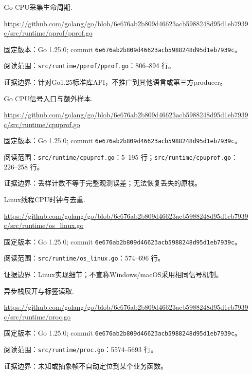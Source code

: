 \documentclass[UTF8,fontset=fandol,openany,11pt]{ctexbook}
\begin{document}
\begin{thebibliography}{999}
 Go CPU采集生命周期.\par
\url{https://github.com/golang/go/blob/6e676ab2b809d46623acb5988248d95d1eb7939c/src/runtime/pprof/pprof.go}\par
{\small\raggedright 固定版本：Go 1.25.0; commit \texttt{6e676ab2\allowbreak{}b809d466\allowbreak{}23acb598\allowbreak{}8248d95d\allowbreak{}1eb7939c}。\par
阅读范围：\nolinkurl{src/runtime/pprof/pprof.go}：806–894 行。\par
证据边界：针对Go1.25标准库API，不推广到其他语言或第三方producer。
}

 Go CPU信号入口与额外样本.\par
\url{https://github.com/golang/go/blob/6e676ab2b809d46623acb5988248d95d1eb7939c/src/runtime/cpuprof.go}\par
{\small\raggedright 固定版本：Go 1.25.0; commit \texttt{6e676ab2\allowbreak{}b809d466\allowbreak{}23acb598\allowbreak{}8248d95d\allowbreak{}1eb7939c}。\par
阅读范围：\nolinkurl{src/runtime/cpuprof.go}：5–195 行；\nolinkurl{src/runtime/cpuprof.go}：226–258 行。\par
证据边界：丢样计数不等于完整观测误差；无法恢复丢失的原栈。
}

 Linux线程CPU时钟与去重.\par
\url{https://github.com/golang/go/blob/6e676ab2b809d46623acb5988248d95d1eb7939c/src/runtime/os_linux.go}\par
{\small\raggedright 固定版本：Go 1.25.0; commit \texttt{6e676ab2\allowbreak{}b809d466\allowbreak{}23acb598\allowbreak{}8248d95d\allowbreak{}1eb7939c}。\par
阅读范围：\nolinkurl{src/runtime/os_linux.go}：574–696 行。\par
证据边界：Linux实现细节；不宣称Windows/macOS采用相同信号机制。
}

 异步栈展开与标签读取.\par
\url{https://github.com/golang/go/blob/6e676ab2b809d46623acb5988248d95d1eb7939c/src/runtime/proc.go}\par
{\small\raggedright 固定版本：Go 1.25.0; commit \texttt{6e676ab2\allowbreak{}b809d466\allowbreak{}23acb598\allowbreak{}8248d95d\allowbreak{}1eb7939c}。\par
阅读范围：\nolinkurl{src/runtime/proc.go}：5574–5693 行。\par
证据边界：未知或抽象帧不自动定位到某个业务函数。
}


\end{thebibliography}
\end{document}
